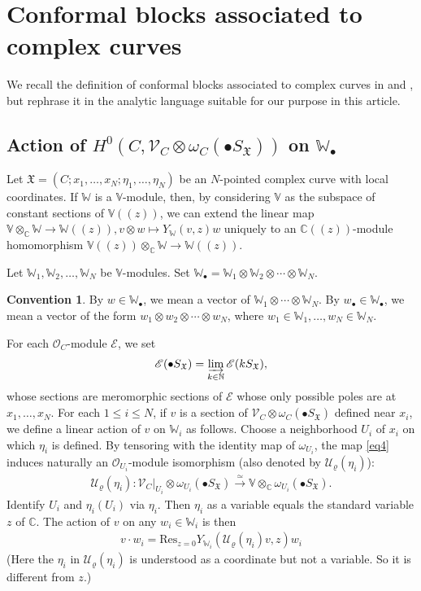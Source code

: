\documentclass[12pt,a4paper,notitlepage]{article}
\theoremstyle{definition}
\newtheorem{cv}[df]{Convention}
\theoremstyle{plain}
\newcommand{\fk}{\mathfrak}
\newcommand{\mc}{\mathcal}
\newcommand{\Res}{\mathrm{Res}}
\newcommand{\scr}{\mathscr}
\newcommand{\SX}{S_{\fk X}}
\newcommand{\blt}{\bullet}
\newcommand{\Vbb}{\mathbb V}
\newcommand{\Wbb}{\mathbb W}
\newcommand{\Cbb}{\mathbb C}
\newcommand{\Nbb}{\mathbb N}
\numberwithin{equation}{section}
\begin{document}
\section{Conformal blocks associated to complex curves}\label{lb15}


We recall the definition of conformal blocks associated to complex curves in \cite{FB04} and \cite{DGT19a,DGT19b}, but rephrase it in the analytic language suitable for our purpose in this article.


\subsection*{Action of $H^0(C,\scr V_C\otimes\omega_C(\blt S_{\fk X}))$ on $\Wbb_\blt$}


Let $\fk X=(C;x_1,\dots,x_N;\eta_1,\dots,\eta_N)$ be an $N$-pointed complex curve with local coordinates. If $\Wbb$ is a $\Vbb$-module, then, by considering $\Vbb$ as the subspace of constant sections of $\Vbb((z))$, we can extend the linear map $\Vbb\otimes_\Cbb\Wbb\rightarrow\Wbb((z)),v\otimes w\mapsto Y_\Wbb(v,z)w$ uniquely to an $\Cbb((z))$-module homomorphism  $\Vbb((z))\otimes_\Cbb\Wbb\rightarrow\Wbb((z))$. 


Let $\Wbb_1,\Wbb_2,\dots,\Wbb_N$ be $\Vbb$-modules. Set \index{Ww@$\Wbb_\blt,w_\blt$} $\Wbb_\blt=\Wbb_1\otimes \Wbb_2\otimes\cdots\otimes \Wbb_N$.  


\begin{cv}
	By $w\in\Wbb_\blt$, we mean a vector of $\Wbb_1\otimes\cdots\otimes \Wbb_N$.  By $w_\blt\in \Wbb_\blt$, we mean a vector of the form $w_1\otimes w_2\otimes\cdots\otimes w_N$, where $w_1\in \Wbb_1,\dots,w_N\in\Wbb_N$.
\end{cv}

For each $\scr O_C$-module $\scr E$,  we \index{SX@$k\SX,\blt\SX$} set
\begin{align*}
\scr E(\blt\SX)=\varinjlim_{k\in\Nbb}\scr E(k\SX),
\end{align*}
whose sections are meromorphic sections of $\scr E$ whose only possible poles are at $x_1,\dots,x_N$. For each $1\leq i\leq N$, if $v$ is a section of $\scr V_C\otimes\omega_C(\blt S_{\fk X})$ defined near $x_i$, we define a linear action of $v$ on $\Wbb_i$ as follows. Choose a neighborhood $U_i$ of $x_i$ on which $\eta_i$ is defined. By tensoring with the identity map of $\omega_{U_i}$,  the map \eqref{eq4} induces naturally an $\scr O_{U_i}$-module isomorphism (also denoted by $\mc U_\varrho(\eta_i)$):
\begin{align*}
\mc U_\varrho(\eta_i):\scr V_C|_{U_i}\otimes\omega_{U_i}(\blt S_{\fk X})\xrightarrow{\simeq}\Vbb\otimes_{\Cbb}\omega_{U_i}(\blt S_{\fk X}).
\end{align*}
Identify $U_i$ and $\eta_i(U_i)$ via $\eta_i$. Then $\eta_i$ as a variable equals the standard variable $z$ of $\Cbb$. The action of $v$ on any $w_i\in\Wbb_i$ \index{vw@$v\cdot w_i,v\cdot w_\blt$} is  then
\begin{align}
\boxed{~~v\cdot w_i=\Res_{z=0}Y_{\Wbb_i}(\mc U_\varrho(\eta_i)v,z)w_i~~}\label{eq26}
\end{align}
(Here the $\eta_i$ in $\mc U_\varrho(\eta_i)$ is understood as a coordinate but not a variable. So it is different from $z$.)
\end{document}
